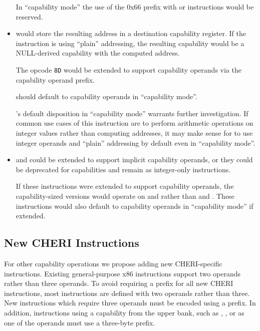 \begin{itemize}
    In ``capability mode'' the use of the 0x66 prefix with
     or  instructions would be
    reserved.

  \item {} would store the resulting address in a
    destination capability register.  If the instruction is using ``plain''
    addressing, the resulting capability would be a NULL-derived
    capability with the computed address.

    The opcode \texttt{8D} would be extended to support capability
    operands via the capability operand prefix.

     should default to capability operands in
    ``capability mode''.

    's default disposition in ``capability mode''
    warrants further investigation.  If common use cases of this
    instruction are to perform arithmetic operations on integer values
    rather than computing addresses, it may make sense for
     to use integer operands and ``plain'' addressing
    by default even in ``capability mode''.

  \item {} and  could be extended to
    support implicit capability operands, or they could be deprecated
    for capabilities and remain as integer-only instructions.

    If these instructions were extended to support capability
    operands, the capability-sized versions would operate on \CSP{}
    and \CBP{} rather than \RSP{} and \RBP{}.  These instructions
    would also default to capability operands in ``capability mode''
    if extended.
\end{itemize}

\subsection{New CHERI Instructions}

For other capability operations we
propose adding new CHERI-specific instructions.
Existing general-purpose x86 instructions support two operands rather
than three operands.  To avoid requiring a \VEX{} prefix for all new
CHERI instructions, most instructions are defined with two operands
rather than three.  New instructions which require three operands must
be encoded using a \VEX{} prefix.  In addition, instructions using a
capability from the upper bank, such as \DDC{}, \CFS{}, or \CGS{} as
one of the operands must use a three-byte \VEX{} prefix.

